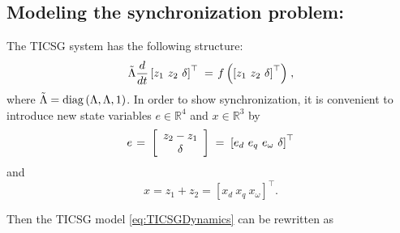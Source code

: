 \documentclass[letterpaper, 10 pt, conference]{ieeeconf}
\newcommand{\rline}  {{\mathbb R}}
\renewcommand{\o}    {{\omega}}
\newcommand{\m}      {{\hbox{\hskip 1pt}}}
\begin{document}
\subsection{Modeling the synchronization problem:} 
\label{sec:SyncProbModel}

The TICSG system has the following structure:
$$ \tilde{\Lambda}\frac{d}{dt}\left[z_1\ z_2\ \delta\right]^{\top}
   \m=\m f\left( \left[z_1\ z_2\ \delta\right]^{\top} \right) \m,$$
where $\tilde{\Lambda}={\rm diag}\left(\Lambda,\Lambda,1\right)$.
In order to show synchronization, it is convenient to introduce new 
state variables $e\in\rline^4$ and $x\in\rline^3$ by
$$ e \m=\m \left[ \begin{array}{c} z_2 - z_1\\ \delta \end{array} 
   \right] \m=\m \left[e_d\ e_q\ e_\o\ \delta \right]^\top$$
and 
$$x =z_1+z_2 = \left[ x_d\ x_q\ x_\omega\right]^\top.$$  

Then the TICSG model \eqref{eq:TICSGDynamics} can be rewritten as
\end{document}
